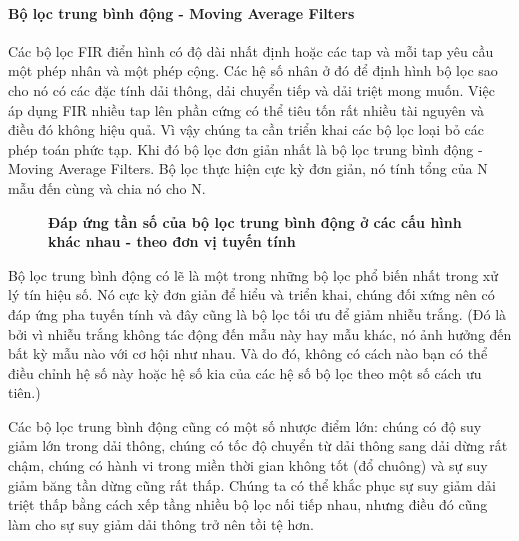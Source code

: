 \paragraph{Bộ lọc trung bình động - Moving Average Filters}\label{maf}
Các bộ lọc FIR điển hình có độ dài nhất định hoặc các tap và mỗi tap yêu cầu một phép nhân và một phép cộng. Các hệ số nhân ở đó để định hình bộ lọc sao cho nó có các đặc tính dải thông, dải chuyển tiếp và dải triệt mong muốn. Việc áp dụng FIR nhiều tap lên phần cứng có thể tiêu tốn rất nhiều tài nguyên và điều đó không hiệu quả. Vì vậy chúng ta cần triển khai các bộ lọc loại bỏ các phép toán phức tạp. Khi đó bộ lọc đơn giản nhất là bộ lọc trung bình động - Moving Average Filters. Bộ lọc thực hiện cực kỳ đơn giản, nó tính tổng của N mẫu đến cùng và chia nó cho N.
\begin{figure}[H]
    \centering
    
    \caption[Đáp ứng tần số của bộ lọc trung bình động ở các cấu hình khác nhau - theo đơn vị tuyến tính]{\bfseries \fontsize{12pt}{0pt}\selectfont Đáp ứng tần số của bộ lọc trung bình động ở các cấu hình khác nhau - theo đơn vị tuyến tính}
    \label{moving_average_filter_overview_linear}
\end{figure}
Bộ lọc trung bình động có lẽ là một trong những bộ lọc phổ biến nhất trong xử lý tín hiệu số. Nó cực kỳ đơn giản để hiểu và triển khai, chúng đối xứng nên có đáp ứng pha tuyến tính và đây cũng là bộ lọc tối ưu để giảm nhiễu trắng. (Đó là bởi vì nhiễu trắng không tác động đến mẫu này hay mẫu khác, nó ảnh hưởng đến bất kỳ mẫu nào với cơ hội như nhau. Và do đó, không có cách nào bạn có thể điều chỉnh hệ số này hoặc hệ số kia của các hệ số bộ lọc theo một số cách ưu tiên.)

Các bộ lọc trung bình động cũng có một số nhược điểm lớn: chúng có độ suy giảm lớn trong dải thông, chúng có tốc độ chuyển từ dải thông sang dải dừng rất chậm, chúng có hành vi trong miền thời gian không tốt (đổ chuông) và sự suy giảm băng tần dừng cũng rất thấp. Chúng ta có thể khắc phục sự suy giảm dải triệt thấp bằng cách xếp tầng nhiều bộ lọc nối tiếp nhau, nhưng điều đó cũng làm cho sự suy giảm dải thông trở nên tồi tệ hơn.


